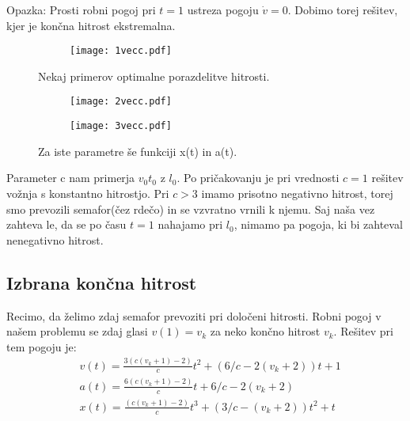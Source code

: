 \documentclass{article}
\begin{document}
Opazka: Prosti robni pogoj pri $t=1$ ustreza pogoju $\dot{v}=0$. Dobimo torej rešitev, kjer je končna hitrost ekstremalna.
\begin{figure}[H]
\centering
\begin{subfigure}{.5\textwidth}
\texttt{[image: 1vecc.pdf]}
\end{subfigure}
\caption*{Nekaj primerov optimalne porazdelitve hitrosti.}
\end{figure}
\begin{figure}[H]
\begin{subfigure}{.5\textwidth}
\texttt{[image: 2vecc.pdf]}
\end{subfigure}
\begin{subfigure}{.5\textwidth}
\texttt{[image: 3vecc.pdf]}
\end{subfigure}
\caption*{Za iste parametre še funkciji x(t) in a(t).}
\end{figure}

Parameter c nam primerja $v_0 t_0$ z $l_0$. Po pričakovanju je pri vrednosti $c=1$ rešitev vožnja s konstantno hitrostjo. Pri $c>3$ imamo prisotno negativno hitrost, torej smo prevozili semafor(čez rdečo) in se vzvratno vrnili k njemu. Saj naša vez zahteva le, da se po času $t=1$ nahajamo pri $l_0$, nimamo pa pogoja, ki bi zahteval nenegativno hitrost.
\subsection{Izbrana končna hitrost}
Recimo, da želimo zdaj semafor prevoziti pri določeni hitrosti. Robni pogoj v našem problemu se zdaj glasi $v(1)=v_k$ za neko končno hitrost $v_k$. Rešitev pri tem pogoju je:
\begin{align*}
&v(t) = \frac{3(c(v_k + 1)-2) }{c} t^2 + (6/c -2(v_k+2))t + 1 \\
&a(t) = \frac{6(c(v_k + 1)-2) }{c} t + 6/c -2(v_k+2) \\
&x(t) = \frac{(c(v_k + 1)-2) }{c} t^3 + (3/c -(v_k+2))t^2 + t \\
\end{align*}
\end{document}
